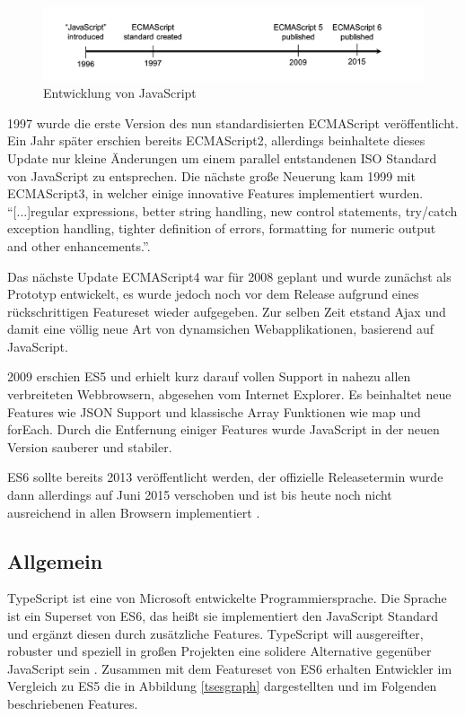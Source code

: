 \begin{figure}[hp]
 \centering
 \includegraphics[width=\linewidth]{kapitel2/javascript-timeline.png}
 \caption{Entwicklung von JavaScript \cite[28]{EssentialTS}}
\end{figure}

1997 wurde die erste Version des nun standardisierten ECMAScript veröffentlicht. Ein Jahr später erschien bereits ECMAScript2,
allerdings beinhaltete dieses Update nur kleine Änderungen um einem parallel entstandenen ISO Standard von JavaScript zu entsprechen.
Die nächste große Neuerung kam 1999 mit ECMAScript3, in welcher einige innovative Features implementiert wurden.
``[...]regular expressions, better string handling, new control statements, try/catch exception handling, tighter definition of errors, formatting for numeric output and other enhancements.''\cite{js-vs-es}.

Das nächste Update ECMAScript4 war für 2008 geplant und wurde zunächst als Prototyp entwickelt,
es wurde jedoch noch vor dem Release aufgrund eines rückschrittigen Featureset wieder aufgegeben.
Zur selben Zeit etstand Ajax und damit eine völlig neue Art von dynamsichen Webapplikationen,
basierend auf JavaScript.

2009 erschien \ac{ES5} und erhielt kurz darauf vollen Support in nahezu allen verbreiteten Webbrowsern, abgesehen vom Internet Explorer.
Es beinhaltet neue Features wie \ac{JSON} Support und klassische Array Funktionen wie map und forEach.
Durch die Entfernung einiger Features wurde JavaScript in der neuen Version sauberer und stabiler.

\ac{ES6} sollte bereits 2013 veröffentlicht werden, der offizielle Releasetermin wurde
dann allerdings auf Juni 2015 verschoben und ist bis heute noch nicht ausreichend in allen Browsern implementiert
\cite{js-vs-es}.

\subsection{Allgemein}

TypeScript ist eine von Microsoft entwickelte Programmiersprache.
Die Sprache ist ein Superset von \ac{ES6}, das heißt sie implementiert den JavaScript Standard und ergänzt diesen
durch zusätzliche Features.
TypeScript will ausgereifter, robuster und speziell in großen Projekten eine solidere Alternative gegenüber JavaScript sein \cite[28]{EssentialTS}.
Zusammen mit dem Featureset von \ac{ES6} erhalten Entwickler im Vergleich zu \ac{ES5} die in Abbildung \ref{tsesgraph} dargestellten und im Folgenden beschriebenen Features.


